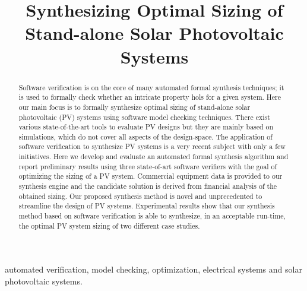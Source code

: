 \documentclass[10pt,conference]{IEEEtran}
\begin{document}
\title{Synthesizing Optimal Sizing of Stand-alone Solar Photovoltaic Systems\\
}

\author{
\and
{}
}

\maketitle

\begin{abstract}
Software verification is on the core of many automated formal synthesis techniques;
it is used to formally check whether an intricate property hols for a given system. 
Here our main focus is to formally synthesize optimal sizing of stand-alone solar photovoltaic (PV) systems
using software model checking techniques. There exist various state-of-the-art tools to evaluate 
PV designs but  they are mainly based on simulations, which do not cover all aspects of the design-space. 
The application of software verification to synthesize PV systems is a very recent subject with only a few initiatives. 
Here we develop and evaluate an automated formal synthesis algorithm and report preliminary results 
using three state-of-art software verifiers with the goal of optimizing the sizing of a PV system. 
Commercial equipment data is provided to our synthesis engine and the candidate solution is derived 
from financial analysis of the obtained sizing. Our proposed synthesis method is novel and 
unprecedented to streamline the design of PV systems. 
Experimental results show that our synthesis method based on software verification is able to synthesize, 
in an acceptable run-time, the optimal PV system sizing of two different case studies.
\end{abstract}

\begin{IEEEkeywords}
automated verification, model checking, optimization, electrical systems and solar photovoltaic systems.
\end{IEEEkeywords}
\end{document}

